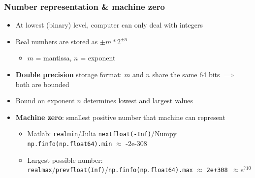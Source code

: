 \documentclass[bigger]{beamer}
\begin{document}
\begin{frame}%

\frametitle{Number representation \& machine zero}

\begin{itemize}
\item At lowest (binary) level, computer can only deal with integers

\item Real numbers are stored as $\pm m\ast 2^{\pm n}$

\begin{itemize}
\item $m$ = mantissa, $n$ = exponent
\end{itemize}

\item \textbf{Double precision} storage format: $m$ and $n$ share the same
64 bits $\implies $ both are bounded

\item Bound on exponent $n$ determines lowest and largest values

\item \textbf{Machine zero}: smallest positive number that machine can
represent

\begin{itemize}
\item Matlab: \texttt{realmin}/Julia \texttt{nextfloat(-Inf)}/Numpy \texttt{np.finfo(np.float64).min} $\approx $ -2e-308

\item Largest possible number: \texttt{realmax}/\texttt{prevfloat(Inf)}/\texttt{np.finfo(np.float64).max} $\approx $ \texttt{2e+308 }$%
\approx e^{710}$
\end{itemize}
\end{itemize}


\end{frame}%
\end{document}
